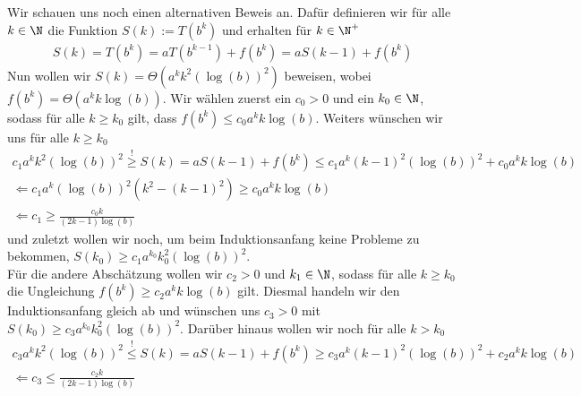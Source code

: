 \begin{solution}
	Wir schauen uns noch einen alternativen Beweis an. Dafür definieren wir für alle $k \in \N$ die Funktion $S(k) := T(b^k)$ und erhalten für $k \in \N^+$
	\begin{align*}
	S(k) = T(b^k) = aT(b^{k-1}) + f(b^k) = a S(k-1) + f(b^k)
	\end{align*}
	Nun wollen wir $S(k) = \Theta(a^k k^2 (\log(b))^2)$ beweisen, wobei $f(b^k) = \Theta(a^k k\log(b))$. Wir wählen zuerst ein $c_0 > 0$ und ein $k_0 \in \N$, sodass für alle $k \geq k_0$ gilt, dass $f(b^k) \leq c_0 a^k k \log(b)$. Weiters wünschen wir uns für alle $k \geq k_0$
	\begin{align*}
	c_1 a^k k^2 (\log(b))^2 \stackrel{!}{\geq} S(k) = a S(k-1) + f(b^k) \leq  c_1 a^k (k - 1)^2 (\log(b))^2 + c_0 a^k k \log(b) \\
	\Leftarrow c_1 a^k (\log(b))^2( k^2 - (k -1)^2) \geq c_0 a^k k \log(b) \\
	\Leftarrow c_1 \geq \frac{c_0 k}{(2k -1) \log(b)}
	\end{align*}
	und zuletzt wollen wir noch, um beim Induktionsanfang keine Probleme zu bekommen, $S(k_0) \geq c_1 a^{k_0} k_0^2 (\log(b))^2$. \\
	Für die andere Abschätzung wollen wir $c_2 > 0$ und $k_1 \in \N$, sodass für alle $k \geq k_0$ die Ungleichung $f(b^k) \geq c_2 a^k k \log(b)$ gilt. Diesmal handeln wir den Induktionsanfang gleich ab und wünschen uns $c_3 > 0$ mit $S(k_0) \geq c_3 a^{k_0} k_0^2 (\log(b))^2 $. Darüber hinaus wollen wir noch für alle $k > k_0$
	\begin{align*}
	c_3 a^k k^2 (\log(b))^2 \stackrel{!}{\leq} S(k) = a S(k-1) + f(b^k) \geq c_3 a^k (k - 1)^2 (\log(b))^2 + c_2 a^k k \log(b) \\
	\Leftarrow c_3 \leq \frac{c_2 k}{(2k - 1) \log(b)}   
	\end{align*}
\end{solution}